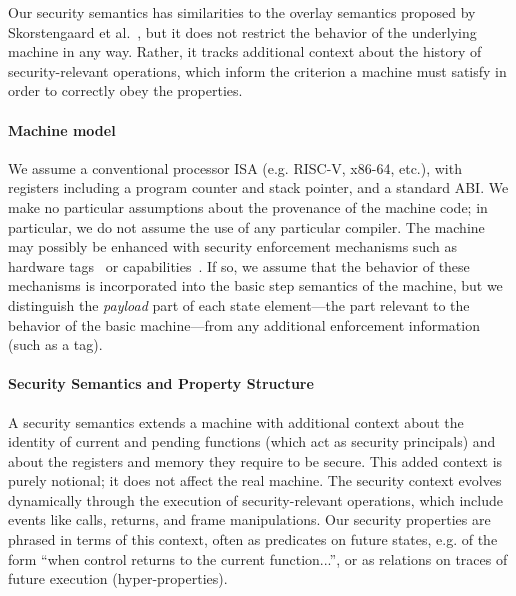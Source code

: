 \documentclass[10pt,conference]{ieeetran}%
\theoremstyle{definition}
\begin{document}
Our security semantics has similarities to the overlay semantics proposed
by Skorstengaard et al.~\cite{SkorstengaardSTKJFP}, but it does not restrict
the behavior of the underlying machine in any way. Rather, it tracks additional context
about the history of security-relevant operations, which inform the criterion a machine
must satisfy in order to correctly obey the properties.


\paragraph*{Machine model}
We assume a conventional processor ISA (e.g. RISC-V, x86-64, etc.), with registers including a program counter
and stack pointer, and a standard ABI.
We make no particular assumptions about the provenance of the machine code; in particular,
we do not assume the use of any particular compiler.
The machine may possibly be enhanced with security
enforcement mechanisms such as hardware tags~\cite{pump_hasp2014,Gollapudi+23} or capabilities~\cite{Woodruff+14}. If so,
we assume that the behavior of these mechanisms is incorporated into the basic
step semantics of the machine, but we distinguish the \emph{payload} part of
each state element---the part relevant to the behavior of the basic machine---from
any additional enforcement information (such as a tag). 

\paragraph*{Security Semantics and Property Structure}
A security semantics extends a machine
with additional context about the identity of current and pending
functions (which act as security principals) and about the registers and memory they require
to be secure. This added context is purely notional;
it does not affect the real machine. The security context
evolves dynamically through the execution of security-relevant operations,
which include events like calls, returns, and frame manipulations.
Our security properties are phrased in terms of this context, often as predicates
on future states, e.g. of the form ``when control returns to the current function...'',
or as relations on traces of future execution (hyper-properties).
\end{document}
